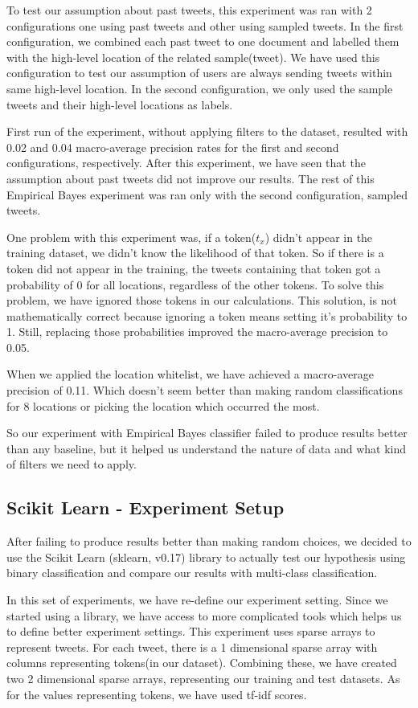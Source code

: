 \documentclass[twoside,11pt]{article}
\begin{document}
To test our assumption about past tweets, this experiment was ran with 2 configurations one using past tweets and other using sampled tweets. In the first configuration, we combined each past tweet to one document and labelled them with the high-level location of the related sample(tweet). We have used this configuration to test our assumption of users are always sending tweets within same high-level location. In the second configuration, we only used the sample tweets and their high-level locations as labels.

First run of the experiment, without applying filters to the dataset, resulted with 0.02 and 0.04 macro-average precision rates for the first and second configurations, respectively. After this experiment, we have seen that the assumption about past tweets did not improve our results. The rest of this Empirical Bayes experiment was ran only with the second configuration, sampled tweets.

One problem with this experiment was, if a token($t_x$) didn't appear in the training dataset, we didn't know the likelihood of that token. So if there is a token did not appear in the training, the tweets containing that token got a probability of 0 for all locations, regardless of the other tokens. To solve this problem, we have ignored those tokens in our calculations. This solution, is not mathematically correct because ignoring a token means setting it's probability to 1. Still, replacing those probabilities improved the macro-average precision to 0.05.

When we applied the location whitelist, we have achieved a macro-average precision of 0.11. Which doesn't seem better than making random classifications for 8 locations or picking the location which occurred the most. 

So our experiment with Empirical Bayes classifier failed to produce results better than any baseline, but it helped us understand the nature of data and what kind of filters we need to apply.

\subsection{Scikit Learn - Experiment Setup}
After failing to produce results better than making random choices, we decided to use the Scikit Learn \cite{scikit-learn}(sklearn, v0.17) library to actually test our hypothesis using binary classification and compare our results with multi-class classification.

In this set of experiments, we have re-define our experiment setting. Since we started using a library, we have access to more complicated tools which helps us to define better experiment settings. This experiment uses sparse arrays to represent tweets. For each tweet, there is a 1 dimensional sparse array with columns representing tokens(in our dataset). Combining these, we have created two 2 dimensional sparse arrays, representing our training and test datasets. As for the values representing tokens, we have used tf-idf scores. 
\end{document}
